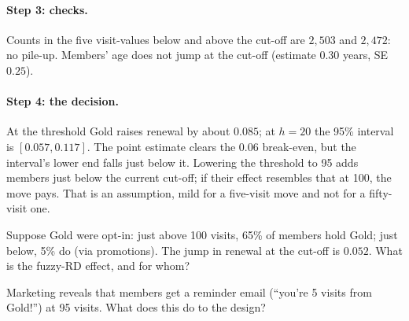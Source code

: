 \documentclass[11pt]{article}
\begin{document}
\paragraph{Step 3: checks.} Counts in the five visit-values below and above the cut-off are $2{,}503$ and $2{,}472$: no pile-up. Members' age does not
jump at the cut-off (estimate $0.30$ years, SE $0.25$).

\paragraph{Step 4: the decision.} At the threshold Gold raises renewal by about $0.085$; at $h = 20$ the 95\% interval is $[0.057, 0.117]$. The
point estimate clears the $0.06$ break-even, but the interval's lower end falls just below it. Lowering the threshold to 95 adds members just below the current cut-off; if their effect resembles that at 100, the move pays.
That is an assumption, mild for a five-visit move and not for a fifty-visit one.

\begin{exercise}[computation]
Suppose Gold were opt-in: just above 100 visits, 65\% of members hold Gold; just below, 5\% do (via promotions). The jump in renewal at the cut-off is
$0.052$. What is the fuzzy-RD effect, and for whom?
\end{exercise}

\begin{exercise}[judgement]
Marketing reveals that members get a reminder email (``you're 5 visits from Gold!'') at 95 visits. What does this do to the design?
\end{exercise}

\sectionthree
\end{document}
